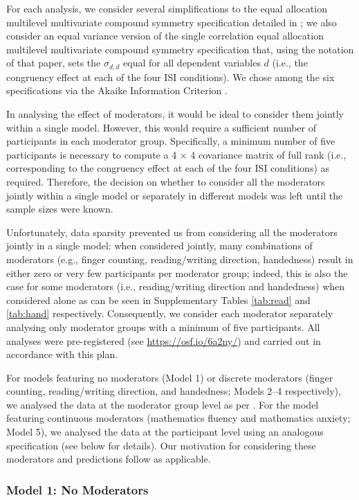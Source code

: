 \documentclass[A4paper,man,floatsintext]{apa6}
\theoremstyle{definition}
\theoremstyle{definition}
\theoremstyle{definition}
\theoremstyle{remark}
\begin{document}
For each analysis, we consider several simplifications to the equal
allocation multilevel multivariate compound symmetry specification
detailed in \textcite{McSBoc18}; we also consider an equal variance
version of the single correlation equal allocation multilevel
multivariate compound symmetry specification that, using the notation of
that paper, sets the \(\sigma_{d,d}\) equal for all dependent variables
\(d\) (i.e., the congruency effect at each of the four ISI conditions).
We chose among the six specifications via the Akaike Information
Criterion \autocite[AIC;][]{Aki74}.

In analysing the effect of moderators, it would be ideal to consider
them jointly within a single model. However, this would require a
sufficient number of participants in each moderator group. Specifically,
a minimum number of five participants is necessary to compute a 4
\(\times\) 4 covariance matrix of full rank (i.e., corresponding to the
congruency effect at each of the four ISI conditions) as required.
Therefore, the decision on whether to consider all the moderators
jointly within a single model or separately in different models was left
until the sample sizes were known.

Unfortunately, data sparsity prevented us from considering all the
moderators jointly in a single model: when considered jointly, many
combinations of moderators (e.g., finger counting, reading/writing
direction, handedness) result in either zero or very few participants
per moderator group; indeed, this is also the case for some moderators
(i.e., reading/writing direction and handedness) when considered alone
as can be seen in Supplementary Tables \ref{tab:read} and \ref{tab:hand}
respectively. Consequently, we consider each moderator separately
analysing only moderator groups with a minimum of five participants. All
analyses were pre-registered (see \url{https://osf.io/6a2ny/}) and
carried out in accordance with this plan.

For models featuring no moderators (Model 1) or discrete moderators
(finger counting, reading/writing direction, and handedness; Models 2--4
respectively), we analysed the data at the moderator group level as per
\textcite{McSBoc18}. For the model featuring continuous moderators
(mathematics fluency and mathematics anxiety; Model 5), we analysed the
data at the participant level using an analogous specification (see
below for details). Our motivation for considering these moderators and
predictions follow as applicable.

\subsubsection{Model 1: No Moderators}\label{model-1-no-moderators}
\end{document}
